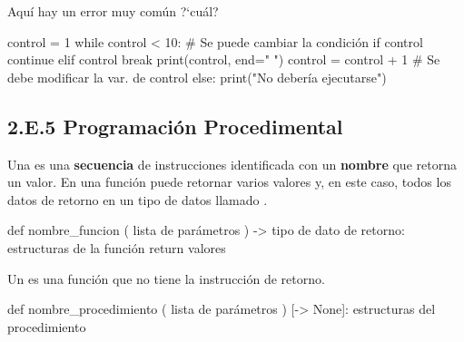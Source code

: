 \begin{ejercicio}
Aquí hay un error muy común ?`cuál?

\hfil\begin{minipage}{.8\textwidth}
\begin{pyverbatim}[][frame=single]
control = 1
while control < 10:   # Se puede cambiar la condición
    if control %
        continue
    elif control %
        break
    print(control, end=" ")
    control = control + 1  # Se debe modificar la var. de control
else:
    print("No debería ejecutarse")
\end{pyverbatim}
\end{minipage}
\end{ejercicio}






\label{subsec:ProgramacionProcedimental}
\subsection*{2.E.5 Programación Procedimental}

Una  es una \textbf{secuencia} de instrucciones identificada con un \textbf{nombre} que retorna un valor.  En  una función puede retornar varios valores y, en este caso,
  todos los datos de retorno en un tipo de datos llamado . 


\hfil
\begin{minipage}{.65\textwidth}
{\footnotesize
\begin{pyverbatim}[][frame=single]
def nombre_funcion ( lista de parámetros ) -> tipo de dato de retorno:  
   estructuras de la función
   return valores 
\end{pyverbatim}
}
\end{minipage}



Un  es una función que no tiene la instrucción de retorno.

\hfil
\begin{minipage}{.65\textwidth}
{\footnotesize
\begin{pyverbatim}[][frame=single]
def nombre_procedimiento ( lista de parámetros ) [-> None]:  
   estructuras del procedimiento
\end{pyverbatim}
}
\end{minipage}


